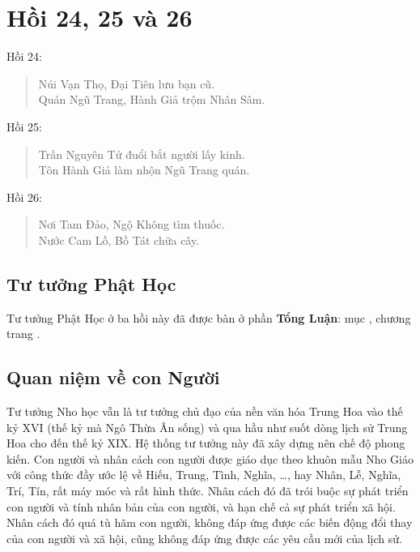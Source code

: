 \chapter{Hồi 24, 25 và 26} %
\label{cha:hoi_24_25_26}

Hồi 24:

\begin{verse}
\begin{itshape}
Núi Vạn Thọ, Đại Tiên lưu bạn cũ.\\
Quán Ngũ Trang, Hành Giả trộm Nhân Sâm.
\end{itshape}
\end{verse}

Hồi 25:

\begin{verse}
\begin{itshape}
Trấn Nguyên Tử đuổi bắt người lấy kinh.\\
Tôn Hành Giả làm nhộn Ngũ Trang quán.
\end{itshape}
\end{verse}

Hồi 26:

\begin{verse}
\begin{itshape}
Nơi Tam Đảo, Ngộ Không tìm thuốc.\\
Nước Cam Lồ, Bồ Tát chữa cây.
\end{itshape}
\end{verse}

\section{Tư tưởng Phật Học} %
\label{sec:24_25_26_phat_hoc}

Tư tưởng Phật Học ở ba hồi này đã được bàn ở phần {\bf Tổng Luận}: mục , chương  trang \pageref{sec:bieu_tuong_cua_hoi_thu_26}.

\section{Quan niệm về con Người} %
\label{sec:24_25_26_con_nguoi}

Tư tưởng Nho học vẫn là tư tưởng chủ đạo của nền văn hóa Trung Hoa vào thế kỷ XVI (thế kỷ mà Ngô Thừa Ân sống) và qua hầu như suốt dòng lịch sử Trung Hoa cho đến thế kỷ XIX. Hệ thống tư tưởng này đã xây dựng nên chế độ phong kiến. Con người và nhân cách con người được giáo dục theo khuôn mẫu Nho Giáo với công thức đầy ước lệ về Hiếu, Trung, Tình, Nghĩa, \ldots, hay Nhân, Lễ, Nghĩa, Trí, Tín, rất máy móc và rất hình thức. Nhân cách đó đã trói buộc sự phát triển con người và tính nhân bản của con người, và hạn chế cả sự phát triển xã hội. Nhân cách đó quá tù hãm con người, không đáp ứng được các biến động đổi thay của con người và xã hội, cũng không đáp ứng được các yêu cầu mới của lịch sử.

